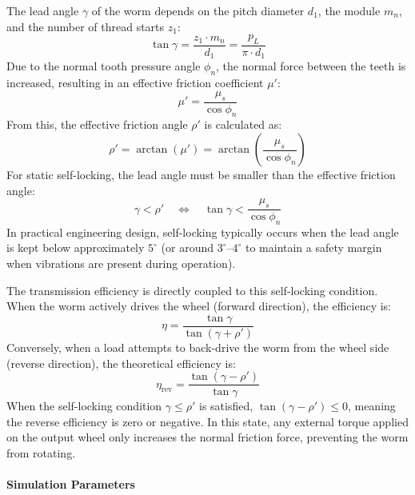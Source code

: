 The lead angle $\gamma$ of the worm depends on the pitch diameter $d_1$, the module $m_n$, and the number of thread starts $z_1$:
\begin{equation}
    \tan \gamma = \frac{z_1 \cdot m_n}{d_1} = \frac{p_L}{\pi \cdot d_1}
\end{equation}
Due to the normal tooth pressure angle $\phi_n$, the normal force between the teeth is increased, resulting in an effective friction coefficient $\mu'$:
\begin{equation}
    \mu' = \frac{\mu_s}{\cos \phi_n}
\end{equation}
From this, the effective friction angle $\rho'$ is calculated as:
\begin{equation}
    \rho' = \arctan(\mu') = \arctan\left(\frac{\mu_s}{\cos \phi_n}\right)
\end{equation}
For static self-locking, the lead angle must be smaller than the effective friction angle:
\begin{equation}
    \gamma < \rho' \quad \Longleftrightarrow \quad \tan \gamma < \frac{\mu_s}{\cos \phi_n}
\end{equation}
In practical engineering design, self-locking typically occurs when the lead angle is kept below approximately $5^\circ$ (or around $3^\circ$--$4^\circ$ to maintain a safety margin when vibrations are present during operation).

The transmission efficiency is directly coupled to this self-locking condition. When the worm actively drives the wheel (forward direction), the efficiency is:
\begin{equation}
    \eta = \frac{\tan \gamma}{\tan(\gamma + \rho')}
    \label{eq:worm-forward-eff}
\end{equation}
Conversely, when a load attempts to back-drive the worm from the wheel side (reverse direction), the theoretical efficiency is:
\begin{equation}
    \eta_{\text{rev}} = \frac{\tan(\gamma - \rho')}{\tan \gamma}
    \label{eq:worm-reverse-eff}
\end{equation}
When the self-locking condition $\gamma \le \rho'$ is satisfied, $\tan(\gamma - \rho') \le 0$, meaning the reverse efficiency is zero or negative. In this state, any external torque applied on the output wheel only increases the normal friction force, preventing the worm from rotating.

\paragraph{Simulation Parameters}

